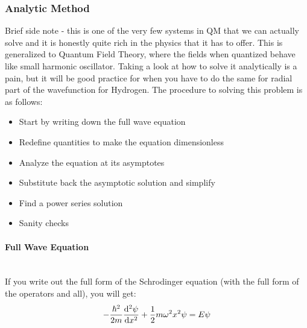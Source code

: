 \subsubsection{Analytic Method}
Brief side note - this is one of the very few systems in QM that we can actually solve and it is honestly quite rich in the physics that it has to offer. This is generalized to Quantum Field Theory, where the fields when quantized behave like small harmonic oscillator. Taking a look at how to solve it analytically is a pain, but it will be good practice for when you have to do the same for radial part of the wavefunction for Hydrogen. The procedure to solving this problem is as follows:
\begin{itemize}
\item Start by writing down the full wave equation
\item Redefine quantities to make the equation dimensionless
\item Analyze the equation at its asymptotes
\item Substitute back the asymptotic solution and simplify
\item Find a power series solution
\item Sanity checks
\end{itemize}
\paragraph{Full Wave Equation}\,\\
If you write out the full form of the Schrodinger equation (with the full form of the operators and all), you will get:
\begin{equation*}
  -\frac{\hbar^{2}}{2m}\dv[2]{\psi}{x}+\frac{1}{2}m\omega^{2}x^{2}\psi=E\psi
\end{equation*}
